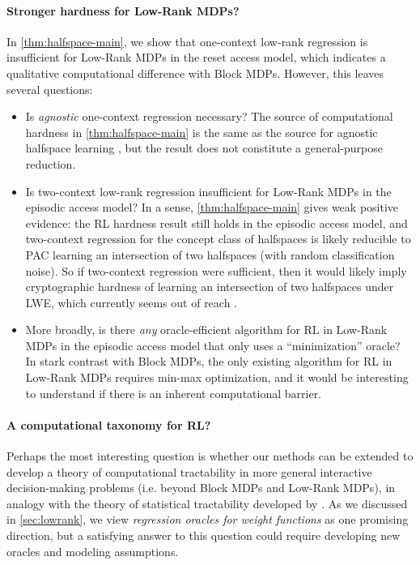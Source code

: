 \paragraph{Stronger hardness for Low-Rank MDPs?} In \cref{thm:halfspace-main}, we show that one-context low-rank regression is insufficient for Low-Rank MDPs in the reset access model, which indicates a qualitative computational difference with Block MDPs. However, this leaves several questions:
\begin{itemize} 
\item Is \emph{agnostic} one-context regression necessary? The source of computational hardness in \cref{thm:halfspace-main} is the same as the source for agnostic halfspace learning \citep{tiegel2023hardness}, but the result does not constitute a general-purpose reduction.

\item Is two-context low-rank regression insufficient for Low-Rank MDPs in the episodic access model? In a sense, \cref{thm:halfspace-main} gives weak positive evidence: the RL hardness result still holds in the episodic access model, and two-context regression for the concept class of halfspaces is likely reducible to PAC learning an intersection of two halfspaces (with random classification noise). So if two-context regression were sufficient, then it would likely imply cryptographic hardness of learning an intersection of two halfspaces under LWE, which currently seems out of reach \citep{tiegel2024improved}.


\item More broadly, is there \emph{any} oracle-efficient algorithm for RL in Low-Rank MDPs in the episodic access model that only uses a ``minimization'' oracle? In stark contrast with Block MDPs, the only existing algorithm for RL in Low-Rank MDPs requires min-max optimization, and it would be interesting to understand if there is an inherent computational barrier.
\end{itemize}


\paragraph{A computational taxonomy for RL?} Perhaps the most interesting question is whether our methods can be extended to develop a theory of computational tractability in more general interactive decision-making problems (i.e. beyond Block MDPs and Low-Rank MDPs), in analogy with the theory of statistical tractability developed by \cite{foster2021statistical}. As we discussed in \cref{sec:lowrank}, we view \emph{regression oracles for weight functions} as one promising direction, but a satisfying answer to this question could require developing new oracles and modeling assumptions.

